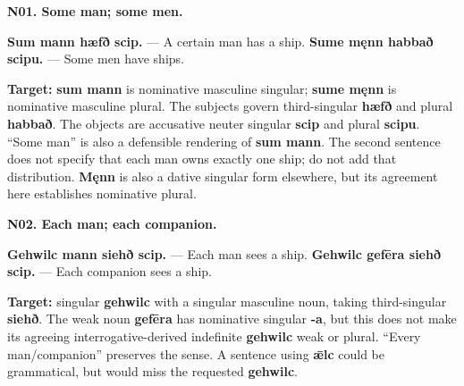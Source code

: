 \par\begin{minipage}{\linewidth}\raggedright
\textbf{N01. Some man; some men.}

\textbf{Sum mann hæfð scip.} — A certain man has a ship. \textbf{Sume męnn habbað scipu.} — Some men have ships.

\textbf{Target:} \textbf{sum mann} is nominative masculine singular; \textbf{sume męnn} is nominative masculine plural. The subjects govern third-singular \textbf{hæfð} and plural \textbf{habbað}. The objects are accusative neuter singular \textbf{scip} and plural \textbf{scipu}. “Some man” is also a defensible rendering of \textbf{sum mann}. The second sentence does not specify that each man owns exactly one ship; do not add that distribution. \textbf{Męnn} is also a dative singular form elsewhere, but its agreement here establishes nominative plural.

\end{minipage}\par\addvspace{4pt}

\par\begin{minipage}{\linewidth}\raggedright
\textbf{N02. Each man; each companion.}

\textbf{Gehwilc mann siehð scip.} — Each man sees a ship. \textbf{Gehwilc gefēra siehð scip.} — Each companion sees a ship.

\textbf{Target:} singular \textbf{gehwilc} with a singular masculine noun, taking third-singular \textbf{siehð}. The weak noun \textbf{gefēra} has nominative singular \textbf{-a}, but this does not make its agreeing interrogative-derived indefinite \textbf{gehwilc} weak or plural. “Every man/\allowbreak{}companion” preserves the sense. A sentence using \textbf{ǣlc} could be grammatical, but would miss the requested \textbf{gehwilc}.

\end{minipage}\par\addvspace{4pt}

